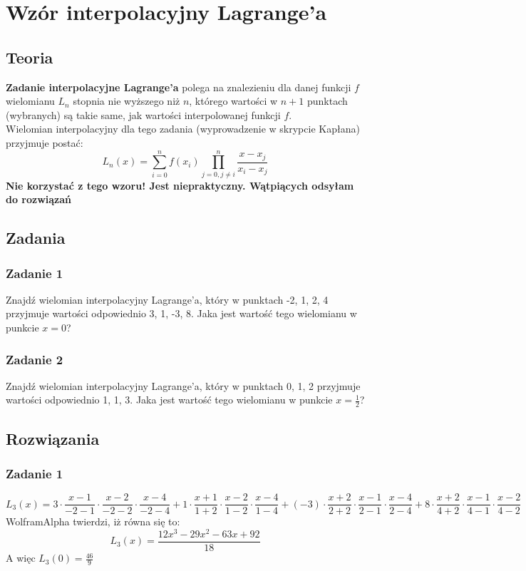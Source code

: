 \documentclass[a4paper]{article}
\begin{document}
\section{Wzór interpolacyjny Lagrange'a}
\subsection{Teoria}
\textbf{Zadanie interpolacyjne Lagrange'a} polega na znalezieniu dla danej funkcji $f$ wielomianu $L_n$ stopnia nie wyższego niż $n$, którego wartości w $n+1$ punktach (wybranych) są takie same, jak wartości interpolowanej funkcji $f$. \\
Wielomian interpolacyjny dla tego zadania (wyprowadzenie w skrypcie Kapłana) przyjmuje postać:
$$L_n(x) = \sum^n_{i=0}f(x_i)\prod^n_{j=0, j\neq i}\frac{x-x_j}{x_i-x_j} $$
\textbf{Nie korzystać z tego wzoru! Jest niepraktyczny. Wątpiących odsyłam do rozwiązań}

\subsection{Zadania}
\subsubsection*{Zadanie 1}
Znajdź wielomian interpolacyjny Lagrange'a, który w punktach -2, 1, 2, 4 przyjmuje wartości odpowiednio 3, 1, -3, 8. Jaka jest wartość tego wielomianu w punkcie $x=0$?
\subsubsection*{Zadanie 2}
Znajdź wielomian interpolacyjny Lagrange'a, który w punktach 0, 1, 2 przyjmuje wartości odpowiednio 1, 1, 3. Jaka jest wartość tego wielomianu w punkcie $x=\frac{1}{2}$?

\subsection{Rozwiązania}

\subsubsection*{Zadanie 1}
$$L_3(x) = 3\cdot\frac{x-1}{-2-1}\cdot\frac{x-2}{-2-2}\cdot\frac{x-4}{-2-4}+1\cdot\frac{x+1}{1+2}\cdot\frac{x-2}{1-2}\cdot\frac{x-4}{1-4}+(-3)\cdot\frac{x+2}{2+2}\cdot\frac{x-1}{2-1}\cdot\frac{x-4}{2-4}+8\cdot\frac{x+2}{4+2}\cdot\frac{x-1}{4-1}\cdot\frac{x-2}{4-2}$$
WolframAlpha twierdzi, iż równa się to:
$$L_3(x) = \frac{12x^3-29x^2-63x+92}{18}$$
A więc $L_3(0) = \frac{46}{9}$
\end{document}
